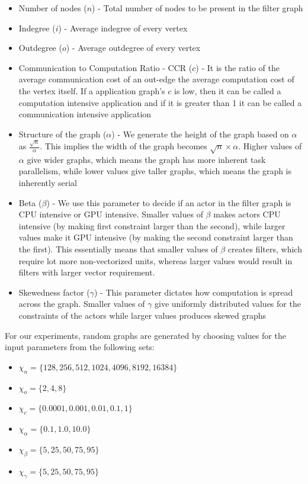 \begin{itemize}
\item Number of nodes ($n$) - Total number of nodes to be present in the
  filter graph
\item Indegree ($i$) - Average indegree of every vertex
\item Outdegree ($o$) - Average outdegree of every vertex
\item Communication to Computation Ratio - CCR ($c$) - It is the ratio
  of the average communication cost of an out-edge the average
  computation cost of the vertex itself. If a application graph's $c$ is low,
  then it can be called a computation intensive application and if it is greater
  than 1 it can be called a communication intensive application
\item Structure of the graph ($\alpha$) - We generate the height of the
  graph based on $\alpha$ as $\frac{\sqrt{n}}{\alpha}$. This implies the
  width of the graph becomes $\sqrt{n} \times {\alpha}$. Higher values of
  $\alpha$ give wider graphs, which means the graph has more inherent
  task parallelism, while lower values give taller graphs, which means
  the graph is inherently serial
\item Beta ($\beta$) - We use this parameter to decide if an actor in
  the filter graph is CPU intensive or GPU intensive. Smaller values of
  $\beta$ makes actors CPU intensive (by making first constraint larger
  than the second), while larger values make it GPU intensive (by making
  the second constraint larger than the first). This essentially means
  that smaller values of $\beta$ creates filters, which require lot more
  non-vectorized units, whereas larger values would result in filters
  with larger vector requirement.
\item Skewedness factor ($\gamma$) - This parameter dictates how
  computation is spread across the graph. Smaller values of $\gamma$
  give uniformly distributed values for the constraints of the actors
  while larger values produces skewed graphs
\end{itemize}

\vspace{1cm}

\noindent For our experiments, random graphs are generated by choosing values for
the input parameters from the following sets:

\begin{itemize}
\item $\chi_{n} = \{128, 256, 512, 1024, 4096, 8192, 16384\}$
\item $\chi_{o} = \{2, 4, 8\}$
\item $\chi_{c} = \{0.0001, 0.001, 0.01, 0.1, 1\}$
\item $\chi_{\alpha} = \{0.1, 1.0, 10.0\}$
\item $\chi_{\beta} = \{5, 25, 50, 75, 95\}$
\item $\chi_{\gamma} = \{5, 25, 50, 75, 95\}$
\end{itemize}

